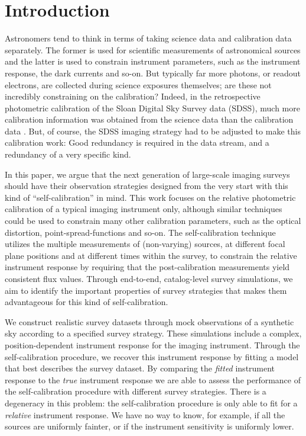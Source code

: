 \documentclass[manuscript]{aastex}
\begin{document}

\section{Introduction}
Astronomers tend to think in terms of taking science data and calibration data separately. The former is used for scientific measurements of astronomical sources and the latter is used to constrain instrument parameters, such as the instrument response, the dark currents and so-on. But typically far more photons, or readout electrons, are collected during science exposures themselves; are these not incredibly constraining on the calibration? Indeed, in the retrospective photometric calibration of the Sloan Digital Sky Survey data (SDSS), much more calibration information was obtained from the science data than the calibration data \citep{pad08}. But, of course, the SDSS imaging strategy had to be adjusted to make this calibration work: Good redundancy is required in the data stream, and a redundancy of a very specific kind.

In this paper, we argue that the next generation of large-scale imaging surveys should have their observation strategies designed from the very start with this kind of ``self-calibration'' in mind. This work focuses on the relative photometric calibration of a typical imaging instrument only, although similar techniques could be used to constrain many other calibration parameters, such as the optical distortion, point-spread-functions and so-on. The self-calibration technique utilizes the multiple measurements of (non-varying) sources, at different focal plane positions and at different times within the survey, to constrain the relative instrument response by requiring that the post-calibration measurements yield consistent flux values. Through end-to-end, catalog-level survey simulations, we aim to identify the important properties of survey strategies that makes them advantageous for this kind of self-calibration. 

We construct realistic survey datasets through mock observations of a synthetic sky according to a specified survey strategy. These simulations include a complex, position-dependent instrument response for the imaging instrument. Through the self-calibration procedure, we recover this instrument response by fitting a model that best describes the survey dataset. By comparing the \textit{fitted} instrument response to the \textit{true} instrument response we are able to assess the performance of the self-calibration procedure with different survey strategies. There is a degeneracy in this problem: the self-calibration procedure is only able to fit for a \textit{relative} instrument response. We have no way to know, for example, if all the sources are uniformly fainter, or if the instrument sensitivity is uniformly lower. 
\end{document}
